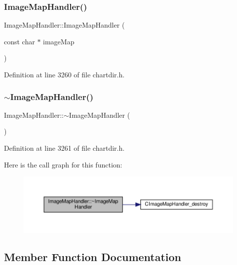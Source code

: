 \subsubsection{\texorpdfstring{Image\+Map\+Handler()}{ImageMapHandler()}}
{\footnotesize\ttfamily Image\+Map\+Handler\+::\+Image\+Map\+Handler (\begin{DoxyParamCaption}\item[{const char $\ast$}]{image\+Map }\end{DoxyParamCaption})\hspace{0.3cm}{\ttfamily [inline]}}



Definition at line 3260 of file chartdir.\+h.

\mbox{\label{class_image_map_handler_a19c82d060f11d562f2d352260717bef3}} 
\subsubsection{\texorpdfstring{$\sim$\+Image\+Map\+Handler()}{~ImageMapHandler()}}
{\footnotesize\ttfamily Image\+Map\+Handler\+::$\sim$\+Image\+Map\+Handler (\begin{DoxyParamCaption}{ }\end{DoxyParamCaption})\hspace{0.3cm}{\ttfamily [inline]}}



Definition at line 3261 of file chartdir.\+h.

Here is the call graph for this function\+:
\nopagebreak
\begin{figure}[H]
\begin{center}
\leavevmode
\includegraphics[width=350pt]{class_image_map_handler_a19c82d060f11d562f2d352260717bef3_cgraph}
\end{center}
\end{figure}


\subsection{Member Function Documentation}
\mbox{\label{class_image_map_handler_a17a681be22adb478e1355a4834fe02e1}} 
